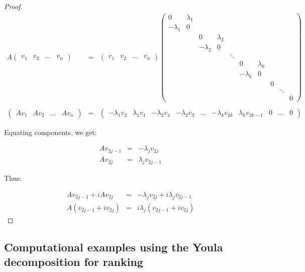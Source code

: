 \documentclass[a4,11pt,twoside,leqno]{report}
\theoremstyle{definition}
\theoremstyle{remark}
\numberwithin{equation}{section}
\begin{document}
\begin{proof}
$$\begin{array}{lcl} A \begin{pmatrix} v_1 & v_2 & \dots & v_n \end{pmatrix} &=& \begin{pmatrix} v_1 & v_2 & \dots & v_n \end{pmatrix}\begin{pmatrix} 0 & \lambda_1\\ -\lambda_1 & 0 \\ &  & 0 & \lambda_2 \\ & & -\lambda_2 & 0 \\ & & & & \ddots \\ & & & & & 0 & \lambda_k \\ & & &  & & -\lambda_k & 0 \\ & & & & & & & 0 \\ & & & & & & & & \ddots \\ & & &  & & & &  & & 0  \end{pmatrix} \\ \\ \begin{pmatrix} Av_1 & Av_2 & \dots & Av_n \end{pmatrix} &=&  \begin{pmatrix} -\lambda_1v_2 & \lambda_1v_1 & -\lambda_2v_4 & -\lambda_2v_3 &\dots & -\lambda_kv_{2k} & \lambda_kv_{2k-1} & 0 & \dots & 0  \end{pmatrix} \end{array}$$

Equating components, we get:

$$\begin{array}{lcl} Av_{2j-1} &=& -\lambda_j v_{2j} \\ Av_{2j}&=&\lambda_j v_{2j-1} \end{array}$$

Thus:

$$\begin{array}{lcl} Av_{2j-1}+iAv_{2j} &=& -\lambda_j v_{2j}+i \lambda_j v_{2j-1} \\ A(v_{2j-1}+iv_{2j}) &=& i\lambda_j(v_{2j-1}+iv_{2j}) \end{array}$$

\end{proof}

\subsection{Computational examples using the Youla decomposition for ranking}
\end{document}

